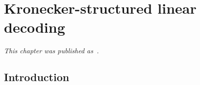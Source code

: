 \chapter{Kronecker-structured linear decoding}
\label{sec:stbf-struct}
\newcommand{\pv}[1]{
	#1
}

  \noindent\emph{This chapter was
  published as~\textcite{VanDenKerchove2022}.}

	\section{Introduction}



